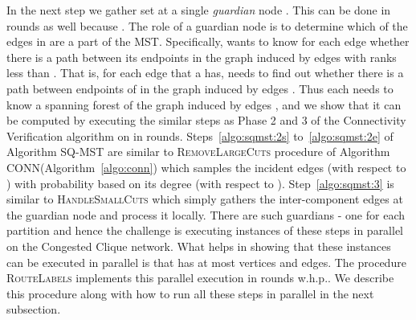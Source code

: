 \documentclass[11pt]{article}
\begin{document}
In the next step we gather set  at a single \textit{guardian} node .
This can be done in  rounds as well because . 
The role of a guardian node  is to determine which of the edges in  are a part of the MST. 
Specifically,  wants to know for each edge  whether there is a path between its endpoints in the graph induced by edges with ranks less than . 
That is, for each edge  that a  has,  needs to find out whether there is a path between endpoints of  in the graph induced by edges  . 
Thus each  needs to know a spanning forest of the graph  induced by edges , and we show that it can be computed by executing the similar steps as Phase 2 and 3 of the Connectivity Verification algorithm on  in  rounds.
Steps~\ref{algo:sqmst:2s} to~\ref{algo:sqmst:2e} of Algorithm \textsc{SQ-MST} are similar to \textsc{RemoveLargeCuts} procedure of Algorithm \textsc{CONN}(Algorithm~\ref{algo:conn}) which samples the incident edges (with respect to ) with probability based on its degree (with respect to ). 
Step~\ref{algo:sqmst:3} is similar to \textsc{HandleSmallCuts} which simply gathers the inter-component edges at the guardian node and process it locally. 
There are  such guardians - one for each partition  and hence the challenge is executing  instances of these steps in parallel on the Congested Clique network. 
What helps in showing that these  instances can be executed in parallel is that  has at most  vertices and  edges. 
The procedure \textsc{RouteLabels} implements this parallel execution in  rounds w.h.p..
We describe this procedure along with how to run all these steps in parallel in the next subsection. 
\end{document}

